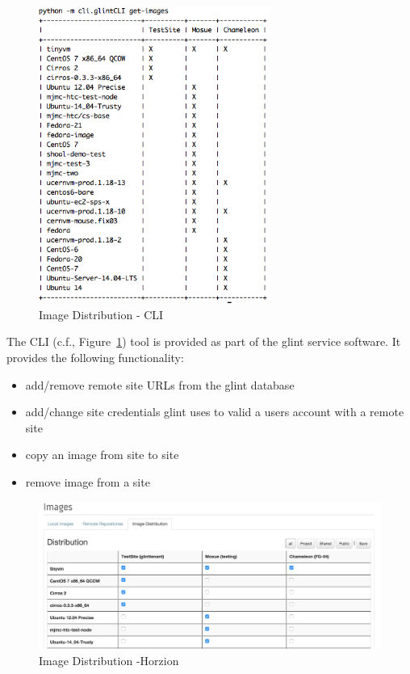 \documentclass[a4paper]{jpconf}
\begin{document}
\begin{figure}[H]
\begin{center}
\includegraphics[width=18pc]{images/glint_cli.png}
\caption{\label{fig:cli}Image Distribution - CLI}
\end{center}
\end{figure}

The CLI (c.f., Figure~\ref{fig:cli}) tool is provided as part of the glint service software. It provides the following functionality:
\begin{itemize}
\item add/remove remote site URLs from the glint database
\item add/change site credentials glint uses to valid a users account with a remote site
\item copy an image from site to site
\item remove image from a site
\end{itemize}

\begin{figure}[H]
\begin{center}
\includegraphics[width=36pc]{images/glint_horizon.png}
\caption{\label{fig:horizon}Image Distribution -Horzion }
\end{center}
\end{figure}
\end{document}
